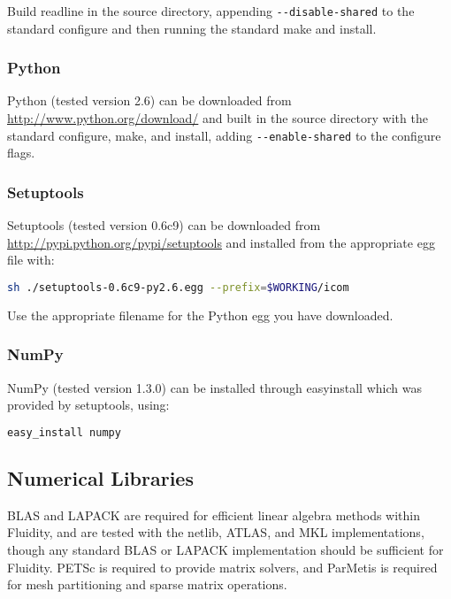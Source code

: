 Build readline in the source directory, appending
\lstinline[language=bash]+--disable-shared+ to the standard configure and then
running the standard make and install.

\subsubsection{Python}
\label{sect:required_libraries_python_python}

Python (tested version 2.6) can be downloaded from
\url{http://www.python.org/download/} and built in the source directory with
the standard configure, make, and install, adding
\lstinline[language=bash]+--enable-shared+ to the configure flags.

\subsubsection{Setuptools}
\label{sect:required_libraries_python_setuptools}

Setuptools (tested version 0.6c9) can be downloaded from
\url{http://pypi.python.org/pypi/setuptools} and installed from the appropriate
egg file with:

\begin{lstlisting}[language=bash]
sh ./setuptools-0.6c9-py2.6.egg --prefix=$WORKING/icom
\end{lstlisting}

Use the appropriate filename for the Python egg you have downloaded.

\subsubsection{NumPy}
\label{sect:required_libraries_python_numpy}

NumPy (tested version 1.3.0) can be installed through
easy{\textunderscore}install which was provided by setuptools, using:

\begin{lstlisting}[language=bash]
easy_install numpy
\end{lstlisting}

\subsection{Numerical Libraries}
\label{sect:required_libraries_numerical}

BLAS and LAPACK are required for efficient linear algebra methods within
Fluidity, and are tested with the netlib, ATLAS, and MKL implementations, though
any standard BLAS or LAPACK implementation should be sufficient for Fluidity.
PETSc is required to provide matrix solvers, and ParMetis is required for mesh
partitioning and sparse matrix operations.

